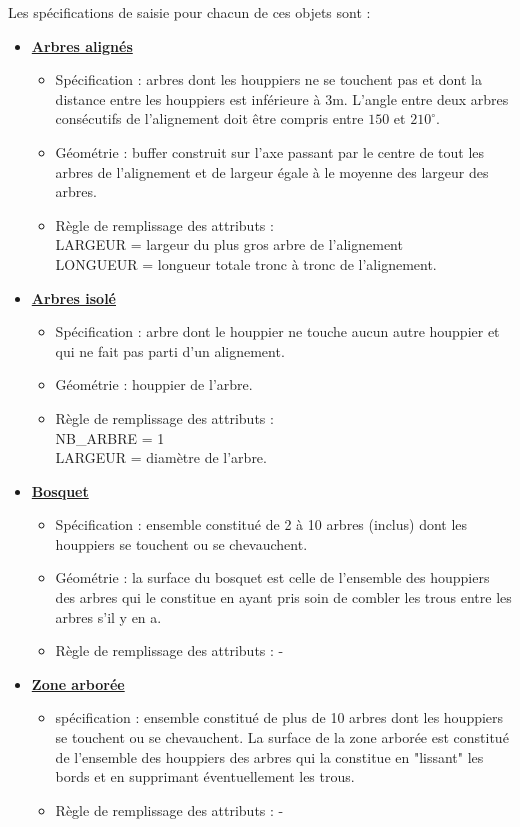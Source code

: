 \documentclass[11pt]{article}
\begin{document}
Les spécifications de saisie pour chacun de ces objets sont :
\begin{itemize}[label=$\bullet$]
	\item \underline{\textbf{Arbres alignés}} 
	\begin{itemize}
		\item Spécification : arbres dont les houppiers ne se touchent pas et dont la distance entre les houppiers est inférieure à 3m. L'angle entre deux arbres consécutifs de l'alignement doit être compris entre $150$ et $210^{\circ}$.
		\item Géométrie : buffer construit sur l'axe passant par le centre de tout les arbres de l'alignement et de largeur égale à le moyenne des largeur des arbres.
		\item Règle de remplissage des attributs : \\
		LARGEUR = largeur du plus gros arbre de l'alignement\\
		LONGUEUR = longueur totale tronc à tronc de l'alignement.
	\end{itemize}
	\item \underline{\textbf{Arbres isolé}}
	\begin{itemize}
		\item Spécification : arbre dont le houppier ne touche aucun autre houppier et qui ne fait pas parti d'un alignement.
		\item Géométrie : houppier de l'arbre.
		\item Règle de remplissage des attributs : \\
		NB\_ARBRE = 1\\
		LARGEUR = diamètre de l'arbre.
	\end{itemize}
	\item \underline{\textbf{Bosquet}} 
	\begin{itemize}
		\item Spécification : ensemble constitué de 2 à 10 arbres (inclus) dont les houppiers se touchent ou se chevauchent. 
		\item Géométrie : la surface du bosquet est celle de l'ensemble des houppiers des arbres qui le constitue en ayant pris soin de combler les trous entre les arbres s'il y en a.
		\item Règle de remplissage des attributs : - \\
	\end{itemize}
	\item \underline{\textbf{Zone arborée}}
	\begin{itemize}
		\item spécification : ensemble constitué de plus de 10 arbres dont les houppiers se touchent ou se chevauchent. La surface de la zone arborée est constitué de l'ensemble des houppiers des arbres qui la constitue en "lissant" les bords et en supprimant éventuellement les trous.
		\item Règle de remplissage des attributs : - \\
	\end{itemize}
\end{itemize}
\end{document}
